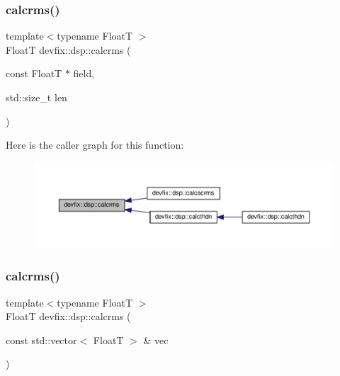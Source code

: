 \subsubsection{\texorpdfstring{calcrms()}{calcrms()}\hspace{0.1cm}{\footnotesize\ttfamily [1/3]}}
{\footnotesize\ttfamily template$<$typename FloatT $>$ \\
FloatT devfix\+::dsp\+::calcrms (\begin{DoxyParamCaption}\item[{const FloatT $\ast$}]{field,  }\item[{std\+::size\+\_\+t}]{len }\end{DoxyParamCaption})}

Here is the caller graph for this function\+:
\nopagebreak
\begin{figure}[H]
\begin{center}
\leavevmode
\includegraphics[width=350pt]{namespacedevfix_1_1dsp_a1d758c2b667d7d48c41677641086387f_icgraph}
\end{center}
\end{figure}
\mbox{\label{namespacedevfix_1_1dsp_a18e7f97d5726a6273908d87a480446a5}} 
\subsubsection{\texorpdfstring{calcrms()}{calcrms()}\hspace{0.1cm}{\footnotesize\ttfamily [2/3]}}
{\footnotesize\ttfamily template$<$typename FloatT $>$ \\
FloatT devfix\+::dsp\+::calcrms (\begin{DoxyParamCaption}\item[{const std\+::vector$<$ FloatT $>$ \&}]{vec }\end{DoxyParamCaption})}

\mbox{\label{namespacedevfix_1_1dsp_a19c2e4d076954efbf0dab3daded46ba7}} 
